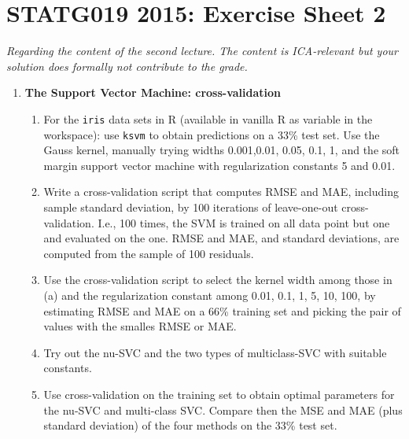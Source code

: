\documentclass[a4paper,10pt,oneside]{article}
\begin{document}
\section*{STATG019 2015: Exercise Sheet 2}
{\em Regarding the content of the second lecture. The content is ICA-relevant but your solution does formally not contribute to the grade.}

\begin{enumerate}

\item {\bf The Support Vector Machine: cross-validation}
\begin{enumerate}
\item For the \texttt{iris} data sets in R (available in vanilla R as variable in the workspace): use \texttt{ksvm} to obtain predictions on a 33\% test set. Use the Gauss kernel, manually trying widths 0.001,0.01, 0.05, 0.1, 1, and the soft margin support vector machine with regularization constants 5 and 0.01.
\item Write a cross-validation script that computes RMSE and MAE, including sample standard deviation, by 100 iterations of leave-one-out cross-validation. I.e., 100 times, the SVM is trained on all data point but one and evaluated on the one. RMSE and MAE, and standard deviations, are computed from the sample of 100 residuals.
\item Use the cross-validation script to select the kernel width among those in (a) and the regularization constant among 0.01, 0.1, 1, 5, 10, 100, by estimating RMSE and MAE on a 66\% training set and picking the pair of values with the smalles RMSE or MAE. 
\item Try out the nu-SVC and the two types of multiclass-SVC with suitable constants.
\item Use cross-validation on the training set to obtain optimal parameters for the nu-SVC and multi-class SVC. Compare then the MSE and MAE (plus standard deviation) of the four methods on the 33\% test set.
\end{enumerate}


\end{enumerate}
\end{document}
